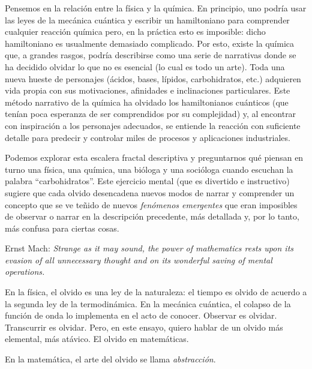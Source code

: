 \documentclass[12pt,a4paper, spanish]{amsart}
\numberwithin{equation}{section}
\theoremstyle{plain}
\theoremstyle{definition}
\begin{document}
Pensemos en la relación entre la física y la química. En principio, uno podría usar las leyes de la mecánica cuántica y escribir un hamiltoniano para comprender cualquier reacción química pero, en la práctica esto es imposible: dicho hamiltoniano es usualmente demasiado complicado. Por esto, existe la química que, a grandes rasgos, podría describirse como una serie de narrativas donde se ha decidido olvidar lo que no es esencial (lo cual es todo un arte). Toda una nueva hueste de personajes (ácidos, bases, lípidos, carbohidratos, etc.) adquieren vida propia con sus motivaciones, afinidades e inclinaciones particulares. Este método narrativo de la química ha olvidado los hamiltonianos cuánticos (que tenían poca esperanza de ser comprendidos por su complejidad) y, al encontrar con inspiración a los personajes adecuados, se entiende la reacción con suficiente detalle para predecir y controlar miles de procesos y aplicaciones industriales. 

Podemos explorar esta escalera fractal descriptiva y preguntarnos qué piensan en turno una física, una química, una bióloga y una socióloga cuando escuchan la palabra ``carbohidratos''. Este ejercicio mental (que es divertido e instructivo) sugiere que cada olvido desencadena nuevos modos de narrar y comprender un concepto que se ve teñido de nuevos \emph{fenómenos emergentes} que eran imposibles de observar o narrar en la descripción precedente, más detallada y, por lo tanto, más confusa para ciertas cosas.

Ernst Mach: \emph{Strange as it may sound, the power of mathematics rests upon its evasion of all unnecessary thought and on its wonderful saving of mental operations.}\autocite[195]{mach1898popular}

En la física, el olvido es una ley de la naturaleza: el tiempo es olvido de acuerdo a la segunda ley de la termodinámica. En la mecánica cuántica, el colapso de la función de onda lo implementa en el acto de conocer. Observar es olvidar. Transcurrir es olvidar. Pero, en este ensayo, quiero hablar de un olvido más elemental, más atávico. El olvido en matemáticas.

En la matemática, el arte del olvido se llama \emph{abstracción}.
\end{document}

